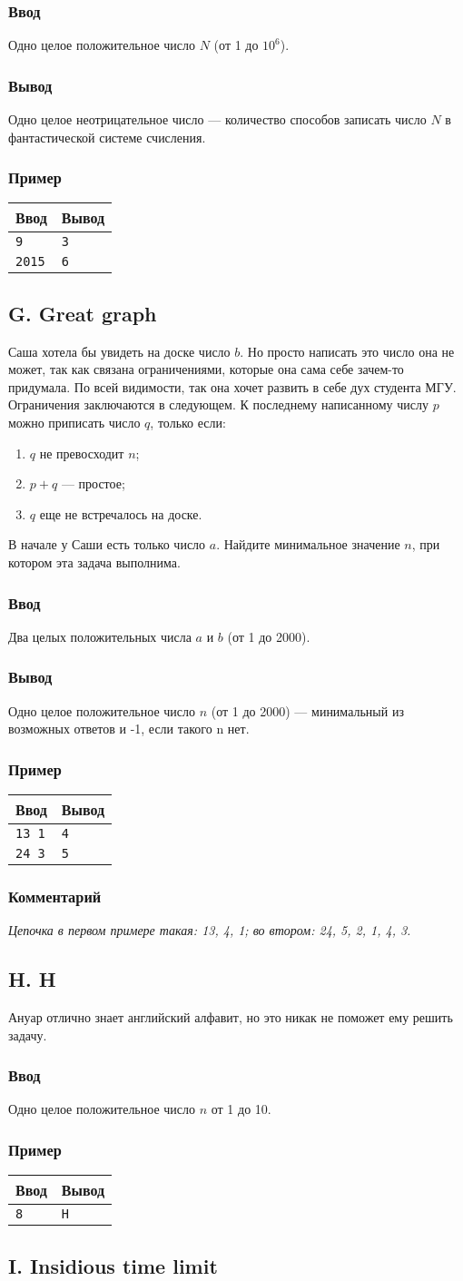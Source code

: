 \documentclass[10pt, a4paper]{article}
\newcommand{\informat}[1]
{
	\subsubsection*{Ввод} #1
}
\newcommand{\outformat}[1]
{
	\subsubsection*{Вывод} #1
}
\newcommand{\example}[2]
{
	\subsubsection*{Пример}
	\noindent
	\begin{center}
	\begin{tabularx}{\linewidth}{|X|X|}
	\hline
	Ввод & Вывод \\
	\hline
	{\tt #1} & {\tt #2}		\\
	\hline
	\end{tabularx}
	\end{center}
}
\newcommand{\examplee}[4]
{
	\subsubsection*{Пример}
	\noindent
	\begin{center}
	\begin{tabularx}{\linewidth}{|X|X|}
	\hline
	Ввод 	& Вывод  	\\
	\hline
	{\tt #1} & {\tt #2}	\\
	\hline
	{\tt #3} & {\tt #4}	\\
	\hline
	\end{tabularx}
	\end{center}
}
\newcommand{\excomm}[1]
{
	\subsubsection*{Комментарий}
	\textit{#1}
}
\begin{document}
\informat{Одно целое положительное число $N$ (от 1 до $10^6$).}

\outformat{Одно целое неотрицательное число --- количество способов записать число $N$ в фантастической системе счисления.}

\examplee{9}{3}{2015}{6}



\subsection*{G. Great graph}

Саша хотела бы увидеть на доске число $b$. Но просто написать это число она не может, так как связана ограничениями, которые она сама себе зачем-то придумала. По всей видимости, так она хочет развить в себе дух студента МГУ. Ограничения заключаются в следующем. К последнему написанному числу $p$ можно приписать число $q$, только если:
\begin{enumerate}
\item $q$ не превосходит $n$;
\item $p+q$ --- простое;
\item $q$ еще не встречалось на доске.
\end{enumerate}
В начале у Саши есть только число $a$. Найдите минимальное значение $n$, при котором эта задача выполнима.

\informat{Два целых положительных числа $a$ и $b$ (от 1 до 2000).}

\outformat{Одно целое положительное число $n$ (от 1 до 2000) --- минимальный из возможных ответов и -1, если такого n нет.}

\examplee{13 1}{4}{24 3}{5}

\excomm{Цепочка в первом примере такая: 13, 4, 1; во втором: 24, 5, 2, 1, 4, 3.}

\subsection*{H. H}

Ануар отлично знает английский алфавит, но это никак не поможет ему решить задачу.

\informat{Одно целое положительное число $n$ от 1 до 10.}

\example{8}{H}



\subsection*{I. Insidious time limit}
\end{document}
